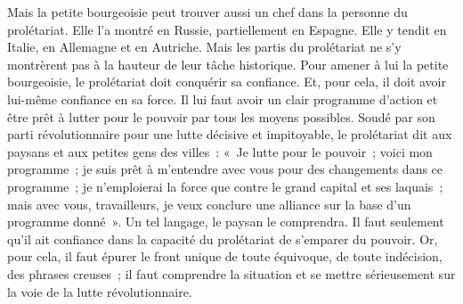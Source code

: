 \documentclass[french,twoside]{book} %
\begin{document}
Mais la petite bourgeoisie peut trouver aussi un chef dans la personne du prolétariat. Elle l’a montré en Russie, partiellement en Espagne. Elle y tendit en Italie, en Allemagne et en Autriche. Mais les partis du prolétariat ne s’y montrèrent pas à la hauteur de leur tâche historique. Pour amener à lui la petite bourgeoisie, le prolétariat doit conquérir sa confiance. Et, pour cela, il doit avoir lui-même confiance en sa force. Il lui faut avoir un clair programme d’action et être prêt à lutter pour le pouvoir par tous les moyens possibles. Soudé par son parti révolutionnaire pour une lutte décisive et impitoyable, le prolétariat dit aux paysans et aux petites gens des villes : « Je lutte pour le pouvoir ; voici mon programme ; je suis prêt à m’entendre avec vous pour des changements dans ce programme ; je n’emploierai la force que contre le grand capital et ses laquais ; mais avec vous, travailleurs, je veux conclure une alliance sur la base d’un programme donné ». Un tel langage, le paysan le comprendra. Il faut seulement qu’il ait confiance dans la capacité du prolétariat de s’emparer du pouvoir. Or, pour cela, il faut épurer le front unique de toute équivoque, de toute indécision, des phrases creuses ; il faut comprendre la situation et se mettre sérieusement sur la voie de la lutte révolutionnaire.
\end{document}
